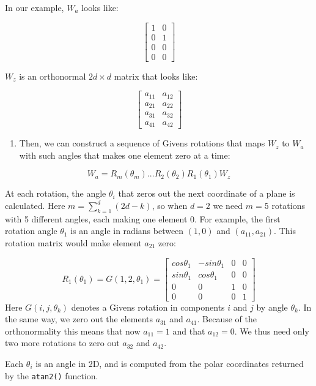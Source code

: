 In our example, \(W_a\) looks like:

\[ \begin{bmatrix}1 & 0 \\0  &1 \\ 0&0 \\0&0\end{bmatrix} \]

\(W_z\) is an orthonormal \(2d\times d\) matrix that looks like:

\[ \begin{bmatrix} a_{11} & a_{12} \\a_{21}  &a_{22} \\ a_{31}&a_{32} \\a_{41}&a_{42}\end{bmatrix} \]

\begin{enumerate}
\def\labelenumi{\arabic{enumi}.}
\setcounter{enumi}{2}
\tightlist
\item
  Then, we can construct a sequence of Givens rotations that maps \(W_z\) to \(W_a\) with such angles that makes one element zero at a time:
\end{enumerate}

\[ W_a = R_m(\theta_m) ... R_2(\theta_2)R_1(\theta_1)W_z\]

At each rotation, the angle \(\theta_i\) that zeros out the next coordinate of a plane is calculated. Here \(m = \sum_{k=1}^d (2d - k)\), so when \(d=2\) we need \(m=5\) rotations with 5 different angles, each making one element 0. For example, the first rotation angle \(\theta_1\) is an angle in radians between \((1, 0)\) and \((a_{11}, a_{21})\). This rotation matrix would make element \(a_{21}\) zero:

\[R_1(\theta_1) = G(1, 2, \theta_1) = \begin{bmatrix} cos\theta_1 & -sin\theta_1 & 0 & 0 \\sin\theta_1  &cos\theta_1 & 0 &0 \\ 0&0&1&0 \\0&0&0&1\end{bmatrix}\]
Here \(G(i,j,\theta_k)\) denotes a Givens rotation in components \(i\) and \(j\) by angle \(\theta_k\).
In the same way, we zero out the elements \(a_{31}\) and \(a_{41}\). Because of the orthonormality this means that now \(a_{11} = 1\) and that \(a_{12} = 0\). We thus need only two more rotations to zero out \(a_{32}\) and \(a_{42}\).

Each \(\theta_i\) is an angle in 2D, and is computed from the polar coordinates returned by the \texttt{atan2()} function.

